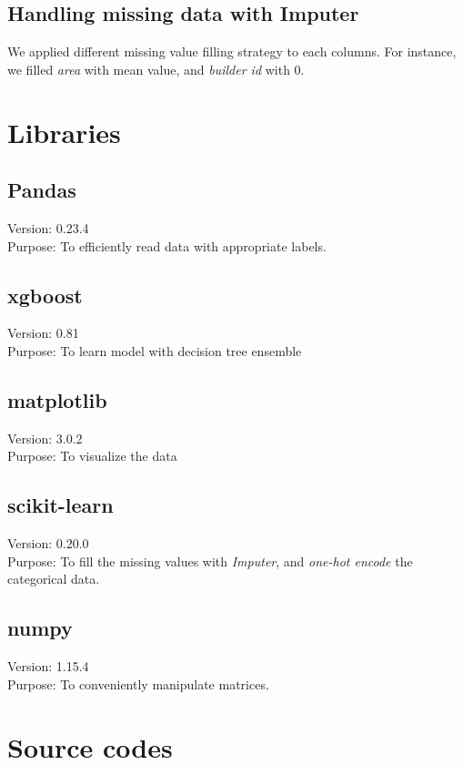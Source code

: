 \documentclass{article}
\begin{document}
\subsection{Handling missing data with Imputer}
We applied different missing value filling strategy to each columns. For instance, we filled \textit{area} with mean value, and \textit{builder id} with 0.

\section{Libraries}


\subsection{Pandas}
Version: 0.23.4 \\
Purpose: To efficiently read data with appropriate labels.

\subsection{xgboost}
Version: 0.81\\
Purpose: To learn model with decision tree ensemble

\subsection{matplotlib}
Version: 3.0.2 \\
Purpose: To visualize the data

\subsection{scikit-learn}
Version: 0.20.0 \\
Purpose: To fill the missing values with \textit{Imputer}, and \textit{one-hot encode} the categorical data.

\subsection{numpy}
Version: 1.15.4 \\
Purpose: To conveniently manipulate matrices.

\section{Source codes}
\end{document}
